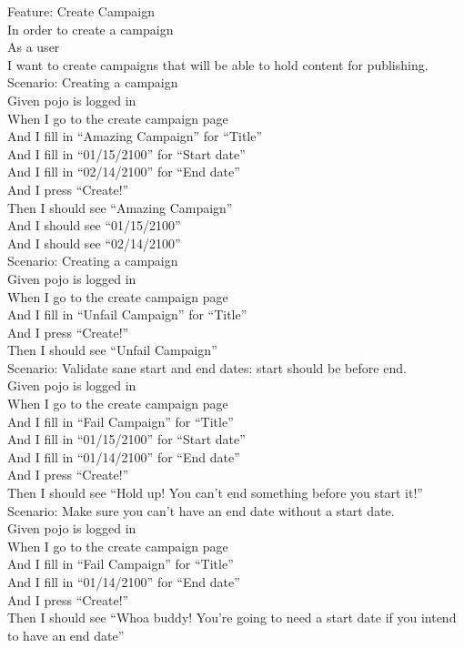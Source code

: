 \documentclass[12pt]{article}
\begin{document}
Feature: Create Campaign \\
  In order to create a campaign \\
  As a user \\
  I want to create campaigns that will be able to hold content for publishing. \\
  
Scenario: Creating a campaign \\
  Given pojo is logged in \\
  When I go to the create campaign page \\
  And I fill in ``Amazing Campaign'' for ``Title'' \\
  And I fill in ``01/15/2100'' for ``Start date'' \\
  And I fill in ``02/14/2100'' for ``End date''   \\
  And I press ``Create!'' \\
  Then I should see ``Amazing Campaign'' \\
  And I should see ``01/15/2100'' \\
  And I should see ``02/14/2100'' \\

Scenario: Creating a campaign \\
  Given pojo is logged in \\
  When I go to the create campaign page \\
  And I fill in ``Unfail Campaign'' for ``Title'' \\
  And I press ``Create!'' \\
  Then I should see ``Unfail Campaign'' \\

Scenario: Validate sane start and end dates: start should be before end. \\
  Given pojo is logged in \\
  When I go to the create campaign page \\
  And I fill in ``Fail Campaign'' for ``Title'' \\
  And I fill in ``01/15/2100'' for ``Start date'' \\
  And I fill in ``01/14/2100'' for ``End date'' \\
  And I press ``Create!'' \\
  Then I should see ``Hold up! You can't end something before you start it!'' \\

Scenario: Make sure you can't have an end date without a start date. \\
  Given pojo is logged in \\
  When I go to the create campaign page \\
  And I fill in ``Fail Campaign'' for ``Title'' \\
  And I fill in ``01/14/2100'' for ``End date'' \\
  And I press ``Create!'' \\
  Then I should see ``Whoa buddy! You're going to need a start date if you intend to have an end date'' \\
\end{document}
